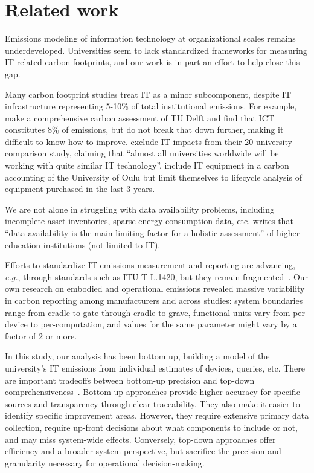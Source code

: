 \documentclass[11pt]{article}
\newcommand{\eg}{{\em e.g.}}
\begin{document}
\section{Related work}
\label{sec:related:work}

Emissions modeling of information technology at organizational scales remains underdeveloped. Universities seem to lack standardized frameworks for measuring IT-related carbon footprints, and our work is in part an effort to help close this gap.

Many carbon footprint studies treat IT as a minor subcomponent, despite IT infrastructure representing 5-10\% of total institutional emissions. For example, \textcite{herth:quantifying:2022} make a comprehensive carbon assessment of TU Delft and find that ICT constitutes 8\% of emissions, but do not break that down further, making it difficult to know how to improve. \textcite{helmers:universities:2021} exclude IT impacts from their 20-university comparison study, claiming that ``almost all universities worldwide will be working with quite similar IT technology''. \textcite{kiehle:2023} include IT equipment in a carbon accounting of the University of Oulu but limit themselves to lifecycle analysis of equipment purchased in the last 3 years.

We are not alone in struggling with data availability problems, including incomplete asset inventories, sparse energy consumption data, etc. \textcite{jurgens:2023} writes that ``data availability is the main limiting factor for a holistic assessment'' of higher education institutions (not limited to IT).

Efforts to standardize IT emissions measurement and reporting are advancing, \eg, through standards such as ITU-T L.1420, but they remain fragmented~\cite{wb:itu:ict}. Our own research on embodied and operational emissions revealed massive variability in carbon reporting among manufacturers and across studies: system boundaries range from cradle-to-gate through cradle-to-grave, functional units vary from per-device to per-computation, and values for the same parameter might vary by a factor of 2 or more.

In this study, our analysis has been bottom up, building a model of the university's IT emissions from individual estimates of devices, queries, etc. There are important tradeoffs between bottom-up precision and top-down comprehensiveness~\cite{hilty:2009:lca}. Bottom-up approaches provide higher accuracy for specific sources and transparency through clear traceability. They also make it easier to identify specific improvement areas. However, they require extensive primary data collection, require up-front decisions about what components to include or not, and may miss system-wide effects. Conversely, top-down approaches offer efficiency and a broader system perspective, but sacrifice the precision and granularity necessary for operational decision-making. 
\end{document}

